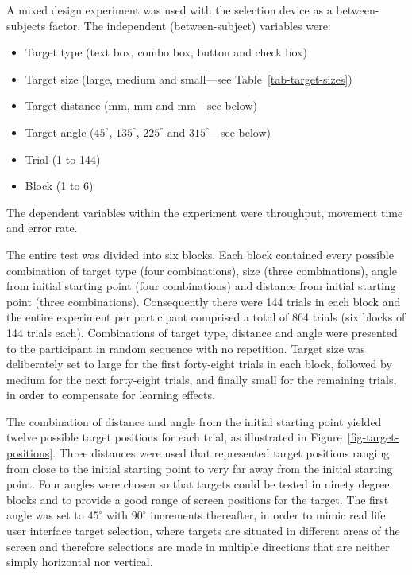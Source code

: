 \documentclass{elsart}
\begin{document}
A mixed design experiment was used with the selection device as a
between-subjects factor. The independent (between-subject) variables
were:
\begin{itemize}

	\item Target type (text box, combo box, button and check box)

	\item Target size (large, medium and small---see
	Table~\ref{tab-target-sizes})

	\item Target distance (\unit[40]{mm}, \unit[80]{mm} and
	\unit[160]{mm}---see below)

	\item Target angle (\(45^{\circ}\), \(135^{\circ}\), \(225^{\circ}\)
	and \(315^{\circ}\)---see below)

	\item Trial (1 to 144)

	\item Block (1 to 6)

\end{itemize}
The dependent variables within the experiment were throughput, movement
time and error rate.

The entire test was divided into six blocks. Each block contained every
possible combination of target type (four combinations), size (three
combinations), angle from initial starting point (four combinations) and
distance from initial starting point (three combinations). Consequently
there were 144 trials in each block and the entire experiment per
participant comprised a total of 864 trials (six blocks of 144 trials
each). Combinations of target type, distance and angle were presented to
the participant in random sequence with no repetition. Target size was
deliberately set to large for the first forty-eight trials in each block,
followed by medium for the next forty-eight trials, and finally small for
the remaining trials, in order to compensate for learning effects.

The combination of distance and angle from the initial starting point
yielded twelve possible target positions for each trial, as illustrated
in Figure~\ref{fig-target-positions}. Three distances were used that
represented target positions ranging from close to the initial starting
point to very far away from the initial starting point. Four angles were
chosen so that targets could be tested in ninety degree blocks and to
provide a good range of screen positions for the target. The first angle
was set to \(45^{\circ}\) with \(90^{\circ}\) increments thereafter, in
order to mimic real life user interface target selection, where targets
are situated in different areas of the screen and therefore selections
are made in multiple directions that are neither simply horizontal nor
vertical.
\end{document}
